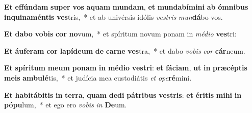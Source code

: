 \item \textbf{Et} \textbf{ef}\textbf{fún}\textbf{dam} \textbf{su}\textbf{per} \textbf{vos} \textbf{a}\textbf{quam} \textbf{mun}\textbf{dam}, \textbf{et} \textbf{mun}\textbf{da}\textbf{bí}\textbf{mi}\textbf{ni} \textbf{ab} \textbf{óm}\textbf{ni}\textbf{bus} \textbf{in}\textbf{qui}\textbf{na}\textbf{mén}\textbf{tis} \textbf{ves}tris,~* et ab univérsis idólis \textit{ves}\textit{tris} \textit{mun}\textbf{dá}bo vos.
\item \textbf{Et} \textbf{da}\textbf{bo} \textbf{vo}\textbf{bis} \textbf{cor} \textbf{no}vum,~* et spíritum novum ponam in \textit{mé}\textit{di}\textit{o} \textbf{ves}tri:
\item \textbf{Et} \textbf{áu}\textbf{fe}\textbf{ram} \textbf{cor} \textbf{la}\textbf{pí}\textbf{de}\textbf{um} \textbf{de} \textbf{car}\textbf{ne} \textbf{ves}tra,~* et dabo \textit{vo}\textit{bis} \textit{cor} \textbf{cár}neum.
\item \textbf{Et} \textbf{spí}\textbf{ri}\textbf{tum} \textbf{me}\textbf{um} \textbf{po}\textbf{nam} \textbf{in} \textbf{mé}\textbf{di}\textbf{o} \textbf{ves}\textbf{tri}: \textbf{et} \textbf{fá}\textbf{ci}\textbf{am}, \textbf{ut} \textbf{in} \textbf{præ}\textbf{cép}\textbf{tis} \textbf{me}\textbf{is} \textbf{am}\textbf{bu}\textbf{lé}tis,~* et judícia mea custodiátis \textit{et} \textit{o}\textit{pe}\textbf{ré}mini.
\item \textbf{Et} \textbf{ha}\textbf{bi}\textbf{tá}\textbf{bi}\textbf{tis} \textbf{in} \textbf{ter}\textbf{ra}, \textbf{quam} \textbf{de}\textbf{di} \textbf{pá}\textbf{tri}\textbf{bus} \textbf{ves}\textbf{tris}: \textbf{et} \textbf{é}\textbf{ri}\textbf{tis} \textbf{mi}\textbf{hi} \textbf{in} \textbf{pó}\textbf{pu}lum,~* et ego ero \textit{vo}\textit{bis} \textit{in} \textbf{De}um.
